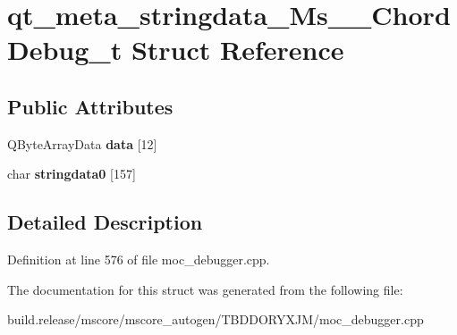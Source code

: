 \hypertarget{structqt__meta__stringdata___ms_____chord_debug__t}{}\section{qt\+\_\+meta\+\_\+stringdata\+\_\+\+Ms\+\_\+\+\_\+\+Chord\+Debug\+\_\+t Struct Reference}
\label{structqt__meta__stringdata___ms_____chord_debug__t}
\subsection*{Public Attributes}
\begin{DoxyCompactItemize}
\item 
\mbox{\label{structqt__meta__stringdata___ms_____chord_debug__t_a3a8e9e1b66dc522a7ccda8e6c8f62da9}} 
Q\+Byte\+Array\+Data {\bfseries data} \mbox{[}12\mbox{]}
\item 
\mbox{\label{structqt__meta__stringdata___ms_____chord_debug__t_aac7bde5bc47c12a1324ffacce44ca018}} 
char {\bfseries stringdata0} \mbox{[}157\mbox{]}
\end{DoxyCompactItemize}


\subsection{Detailed Description}


Definition at line 576 of file moc\+\_\+debugger.\+cpp.



The documentation for this struct was generated from the following file\+:\begin{DoxyCompactItemize}
\item 
build.\+release/mscore/mscore\+\_\+autogen/\+T\+B\+D\+D\+O\+R\+Y\+X\+J\+M/moc\+\_\+debugger.\+cpp\end{DoxyCompactItemize}
